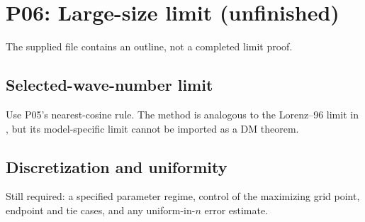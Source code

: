 \section{P06: Large-size limit (unfinished)}
\label{sec:P06}
The supplied file contains an outline, not a completed limit proof.
\subsection{Selected-wave-number limit}\label{slot:P06-1}
Use P05's nearest-cosine rule. The method is analogous to the
Lorenz--96 limit in \cite[Proposition~6]{vanKekemSterk2018}, but
its model-specific limit cannot be imported as a DM theorem.
\subsection{Discretization and uniformity}\label{slot:P06-2}
Still required: a specified parameter regime, control of the maximizing
grid point, endpoint and tie cases, and any uniform-in-$n$ error estimate.
